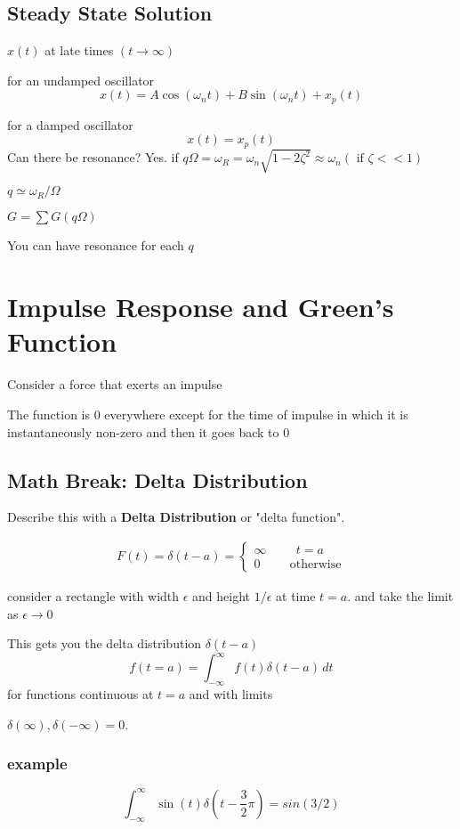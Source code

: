 \documentclass[fleqn]{report}
\newcommand{\hp}{\hspace{1cm}}
\newcommand{\equations} [1] {
\begin{gather*}
#1
\end{gather*}
}
\begin{document}
\section{Steady State Solution}
$x(t)$ at late times $(t \to \infty)$

for an undamped oscillator 
\[
x(t) = A \cos(\omega_n t) + B \sin(\omega_n t) + x_p(t) 
\]

for a damped oscillator 
\[
x(t) = x_p(t) 
\]
Can there be resonance? Yes. 
if 
$q \Omega = \omega_R = \omega_n\sqrt{1 - 2 \zeta^2} \approx
 \omega_n (\textrm{ if $\zeta << 1$})$

$q \simeq \omega_R / \Omega$

$G = \sum G(q \Omega)$

You can have resonance for each $q$

\chapter{Impulse Response and Green's Function}
Consider a force that exerts an impulse 

The function is $0$ everywhere except for the time of impulse in which it is instantaneously non-zero and then it goes back to $0$

\section{Math Break: Delta Distribution}

Describe this with a \textbf{Delta Distribution} or "delta function". 

\equations{
    F(t) = \delta (t - a) = 
    \begin{cases}
    \infty \hp t = a 
    \\
    0 \hp \textrm{otherwise}
    \end{cases}
}


consider a rectangle with width $\epsilon$ and height $1 / \epsilon$ at time $t = a$. and take the limit as $\epsilon \to 0$

This gets you the delta distribution $\delta(t - a)$
\[
f(t = a) = \int^{\infty}_{- \infty} f(t) \delta(t - a) \, dt
\]
for functions continuous at $t = a$ and with limits 

$\delta(\infty), \delta(- \infty) = 0$.

\subsection{example}
\[
\int^{\infty}_{- \infty} \sin(t) \delta(t - \frac{3}{2} \pi ) =
sin(3/2)
\]
\end{document}
